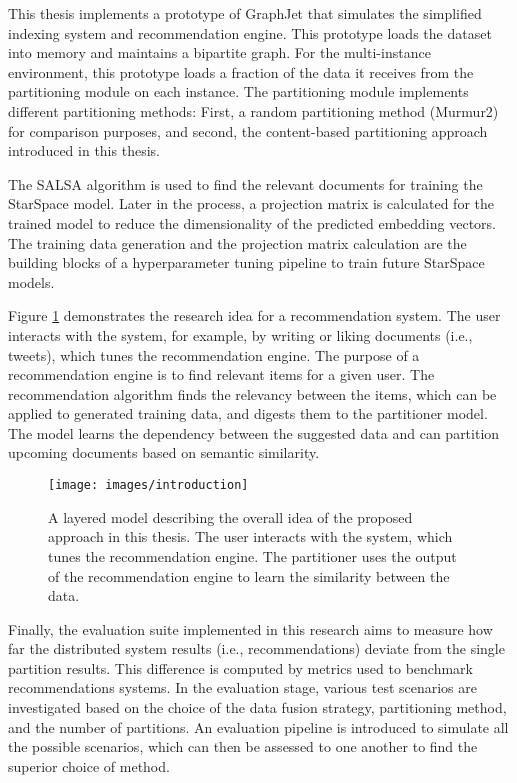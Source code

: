 This thesis implements a prototype of GraphJet that simulates the simplified indexing system and recommendation engine. This prototype loads the dataset into memory and maintains a bipartite graph. For the multi-instance environment, this prototype loads a fraction of the data it receives from the partitioning module on each instance. The partitioning module implements different partitioning methods: First, a random partitioning method (Murmur2) for comparison purposes, and second, the content-based partitioning approach introduced in this thesis.


The SALSA algorithm is used to find the relevant documents for training the StarSpace model. Later in the process, a projection matrix is calculated for the trained model to reduce the dimensionality of the predicted embedding vectors. The training data generation and the projection matrix calculation are the building blocks of a hyperparameter tuning pipeline to train future StarSpace models.


Figure \ref{fig:introduction} demonstrates the research idea for a recommendation system. The user interacts with the system, for example, by writing or liking documents (i.e., tweets), which tunes the recommendation engine. The purpose of a recommendation engine is to find relevant items for a given user. The recommendation algorithm finds the relevancy between the items, which can be applied to generated training data, and digests them to the partitioner model. The model learns the dependency between the suggested data and can partition upcoming documents based on semantic similarity.


\begin{figure}[!htb]
    \centering
    \texttt{[image: images/introduction]}
    \caption{A layered model describing the overall idea of the proposed approach in this thesis. The user interacts with the system, which tunes the recommendation engine. The partitioner uses the output of the recommendation engine to learn the similarity between the data.}
    \label{fig:introduction}
\end{figure}


Finally, the evaluation suite implemented in this research aims to measure how far the distributed system results (i.e., recommendations) deviate from the single partition results. This difference is computed by metrics used to benchmark recommendations systems. In the evaluation stage, various test scenarios are investigated based on the choice of the data fusion strategy, partitioning method, and the number of partitions. An evaluation pipeline is introduced to simulate all the possible scenarios, which can then be assessed to one another to find the superior choice of method.


